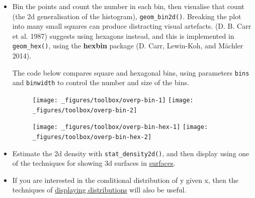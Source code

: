 \begin{itemize}
\item
  Bin the points and count the number in each bin, then visualise that
  count (the 2d generalisation of the histogram),
  \texttt{geom\_bin2d()}. Breaking the plot into many small squares can
  produce distracting visual artefacts. (D. B. Carr et al. 1987)
  suggests using hexagons instead, and this is implemented in
  \texttt{geom\_hex()}, using the \textbf{hexbin} package (D. Carr,
  Lewin-Koh, and Mächler 2014). 

  The code below compares square and hexagonal bins, using parameters
  \texttt{bins} and \texttt{binwidth} to control the number and size of
  the bins.  
   

\begin{Shaded}
\begin{Highlighting}[]
\StringTok{ }\NormalTok{()}
\StringTok{ }\NormalTok{(} \NormalTok{)}
\end{Highlighting}
\end{Shaded}

  \begin{figure}[H]
    \texttt{[image: \_figures/toolbox/overp-bin-1]}%
    \texttt{[image: \_figures/toolbox/overp-bin-2]}
  \end{figure}

\begin{Shaded}
\begin{Highlighting}[]
\StringTok{ }\NormalTok{()}
\StringTok{ }\NormalTok{(} \NormalTok{)}
\end{Highlighting}
\end{Shaded}

  \begin{figure}[H]
    \texttt{[image: \_figures/toolbox/overp-bin-hex-1]}%
    \texttt{[image: \_figures/toolbox/overp-bin-hex-2]}
  \end{figure}
\item
  Estimate the 2d density with \texttt{stat\_density2d()}, and then
  display using one of the techniques for showing 3d surfaces in
  \protect\hyperlink{sec:surface}{surfaces}.
\item
  If you are interested in the conditional distribution of y given x,
  then the techniques of \protect\hyperlink{sub:distribution}{displaying
  distributions} will also be useful.
\end{itemize}

